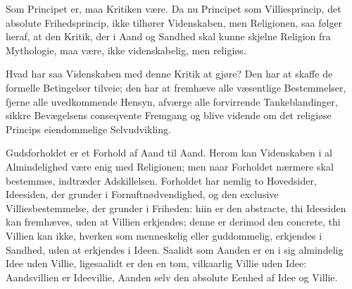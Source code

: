 \documentclass[12pt]{book}
\begin{document}
Som Principet er, maa Kritiken være. Da nu Principet som
Villiesprincip, det absolute Frihedsprincip, ikke tilhører
Videnskaben, men Religionen, saa følger heraf, at den Kritik, der i
Aand og Sandhed skal kunne skjelne Religion fra Mythologie, maa
være, ikke videnskabelig, men religiøs.

Hvad har saa Videnskaben med denne Kritik at gjøre? Den har at
skaffe de formelle Betingelser tilveie; den har at fremhæve alle
væsentlige Bestemmelser, fjerne alle uvedkommende Hensyn, afværge
alle forvirrende Tankeblandinger, sikkre Bevægelsens conseqvente
Fremgang og blive vidende om det religiøse Princips eiendommelige
Selvudvikling.

Gudsforholdet er et Forhold af Aand til Aand. Herom kan Videnskaben
i al Almindelighed være enig med Religionen; men naar Forholdet
nærmere skal bestemmes, indtræder Adskillelsen. Forholdet har nemlig
to Hovedsider, Ideesiden, der grunder i Fornuftnødvendighed, og den
exclusive Villiesbestemmelse, der grunder i Friheden: hiin er den
abstracte, thi Ideesiden kan fremhæves, uden at Villien erkjendes;
denne er derimod den concrete, thi Villien kan ikke, hverken som
menneskelig eller guddommelig, erkjendes i Sandhed, uden at
erkjendes i Ideen. Saalidt som Aanden er en i sig almindelig Idee
uden Villie, ligesaalidt er den en tom, vilkaarlig Villie uden Idee:
Aandsvillien er Ideevillie, Aanden selv den absolute Eenhed af Idee
og Villie.
\end{document}
